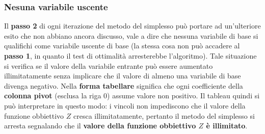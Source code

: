 \documentclass[12pt]{article}
\begin{document}
\subsubsection{Nesuna variabile uscente}
Il \textbf{passo 2} di ogni iterazione del metodo del simplesso può portare ad un'ulteriore esito che non abbiano ancora discusso, vale a dire che nessuna variabile di base si qualifichi come variabile uscente di base (la stessa cosa non può accadere al \textbf{passo 1}, in quanto il test di ottimalità arresterebbe l'algoritmo).
Tale situazione si verifica se il valore della variabile entrante può essere aumentato illimitatamente senza implicare che il valore di almeno una variabile di base divenga negativo.
Nella \textbf{forma tabellare} significa che ogni coefficiente della \textbf{colonna pivot} (esclusa la riga 0) assume valore non positivo.
Il tableau quindi si può interpretare in questo modo: i vincoli non impediscono che il valore della funzione obbiettivo $Z$ cresca illimitatamente, pertanto il metodo del simplesso si arresta segnalando che il \textbf{valore della funzione obbiettivo $Z$ è illimitato}.
\end{document}
